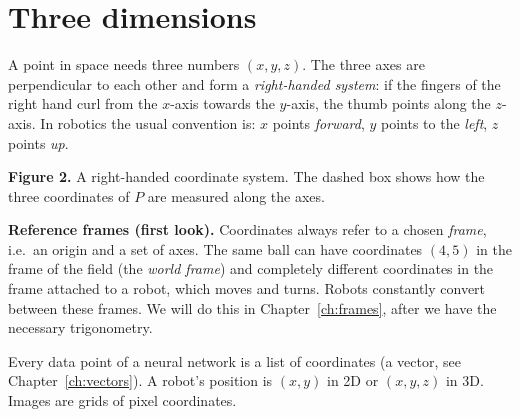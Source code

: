 \section*{Three dimensions}
A point in space needs three numbers $(x,y,z)$. The three axes are perpendicular to each other and form a \emph{right-handed system}: if the fingers of the right hand curl from the $x$-axis towards the $y$-axis, the thumb points along the $z$-axis. In robotics the usual convention is: $x$ points \emph{forward}, $y$ points to the \emph{left}, $z$ points \emph{up}.

\begin{center}

\small\textbf{Figure 2.} A right-handed coordinate system. The dashed box shows how the three coordinates of $P$ are measured along the axes.
\end{center}

\textbf{Reference frames (first look).} Coordinates always refer to a chosen \emph{frame}, i.e.\ an origin and a set of axes. The same ball can have coordinates $(4,5)$ in the frame of the field (the \emph{world frame}) and completely different coordinates in the frame attached to a robot, which moves and turns. Robots constantly convert between these frames. We will do this in Chapter~\ref{ch:frames}, after we have the necessary trigonometry.

\begin{aibox}
Every data point of a neural network is a list of coordinates (a vector, see Chapter~\ref{ch:vectors}). A robot's position is $(x,y)$ in 2D or $(x,y,z)$ in 3D. Images are grids of pixel coordinates.
\end{aibox}


